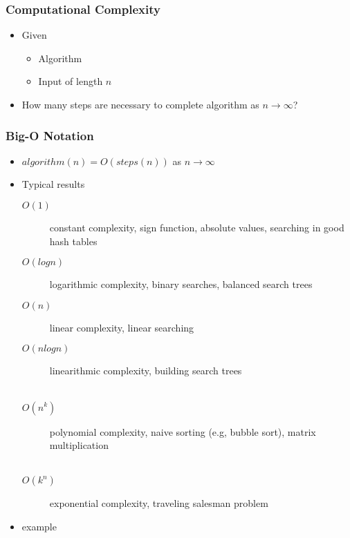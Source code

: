 \begin{frame}
 \frametitle{Computational Complexity}
 \begin{itemize}
  \item Given
   \begin{itemize}
    \item Algorithm
    \item Input of length \( n \)
   \end{itemize}
  \item How many steps are necessary to complete algorithm as \( n \rightarrow \infty \)?
 \end{itemize}
\end{frame}

\begin{frame}
 \frametitle{Big-O Notation}
 \begin{itemize}
  \item \( algorithm(n) = O(steps(n)) \) as \(n \rightarrow \infty \)
  \item Typical results
   \begin{description}
    \item[\(O(1)\)] constant complexity, sign function, absolute values, searching in good hash tables
    \item[\(O(logn)\)] logarithmic complexity, binary searches, balanced search trees
    \item[\(O(n)\)] linear complexity, linear searching
    \item[\(O(nlogn)\)] linearithmic complexity, building search trees \\ \hfill \\
    \item[\(O(n^k)\)] polynomial complexity, naive sorting (e.g, bubble sort), matrix multiplication \\ \hfill \\
    \item[\(O(k^n)\)] exponential complexity, traveling salesman problem
   \end{description}
   \item example 
 \end{itemize}
\end{frame}

